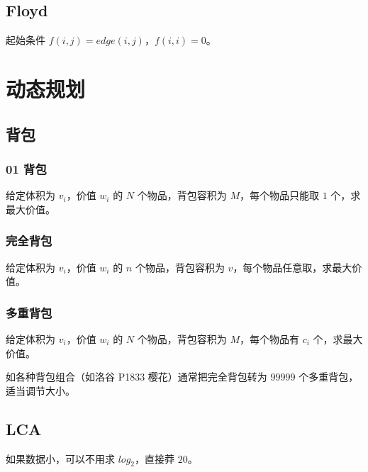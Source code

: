 \documentclass[cn,11pt,black,normal,founder]{elegantbook}
\begin{document}


\section{Floyd}

起始条件 $f(i,j)=edge(i,j)$，$f(i,i)=0$。




\chapter{动态规划}

\section{背包}

\subsection{01 背包}

给定体积为 $v_i$，价值 $w_i$ 的 $N$ 个物品，背包容积为 $M$，每个物品只能取 $1$ 个，求最大价值。



\subsection{完全背包}

给定体积为 $v_i$，价值 $w_i$ 的 $n$ 个物品，背包容积为 $v$，每个物品任意取，求最大价值。



\subsection{多重背包}

给定体积为 $v_i$，价值 $w_i$ 的 $N$ 个物品，背包容积为 $M$，每个物品有 $c_i$ 个，求最大价值。

如各种背包组合（如洛谷 P1833 樱花）通常把完全背包转为 $99999$ 个多重背包，适当调节大小。



\section{LCA}

如果数据小，可以不用求 $log_2$，直接莽 $20$。
\end{document}
